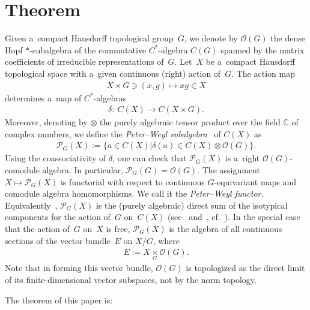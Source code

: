 \section{Theorem}

Given a~compact Hausdorf\/f topological group~$G$, we denote by ${\mathcal O} (G)$ the dense Hopf $*$-subalgebra of the
commutative $C^{*}$-algebra $C(G)$ spanned by the matrix coef\/f\/icients of irreducible representations of~$G$.
Let~$X$ be a~compact Hausdorf\/f topological space with a~given continuous (right) action of~$G$.
The action map
\begin{gather*}
X\times G\ni (x,g)\longmapsto xg\in X
\end{gather*}
determines a~map of $C^{*}$-algebras
\begin{gather*}
\delta\colon \  C(X)\longrightarrow C(X\times G).
\end{gather*}
Moreover, denoting by $\otimes$ the purely algebraic tensor product over the f\/ield $\mathbb{C}$ of complex numbers, we
def\/ine the \emph{Peter--Weyl subalgebra}~\cite[(3.1.4)]{bhms} of $C(X)$ as
\begin{gather*}
\mathcal{P}_G(X):=\{a\in C(X)| \delta(a)\in C(X)\otimes{\mathcal O}(G)\}.
\end{gather*}
Using the coassociativity of $\delta$, one can check that $\mathcal{P}_G(X)$ is a~right ${\mathcal O} (G)$-comodule algebra.
In particular, $\mathcal{P}_G(G)={\mathcal O}(G)$.
The assignment $X\mapsto\mathcal{P}_G(X)$ is functorial with respect to continuous $G$-equivariant maps and comodule algebra homomorphisms.
We call it the \emph{Peter--Weyl functor}.
Equivalently~\cite[Proposition 2.2]{s-pm11}, $\mathcal{P}_G(X)$ is the (purely algebraic) direct sum of the isotypical
components for the action of~$G$ on~$C(X)$ (see~\cite[p.~31]{m-gd61} and~\cite{l-lh53}, cf.~\cite[Theorem~1.5.1]{p-p95}).
In the special case that the action of~$G$ on~$X$ is free, $\mathcal{P}_{G}(X)$ is the algebra of all continuous
sections of the vector bundle~$E$ on $X/G$, where
\begin{gather}\label{vecbun}
E:= X\underset{G}{\times}{\mathcal O}(G).
\end{gather}
Note that in forming this vector bundle, ${\mathcal O}(G)$ is topologized as the direct limit of its f\/inite-dimensional
vector subspaces, not by the norm topology.

The theorem of this paper is:

